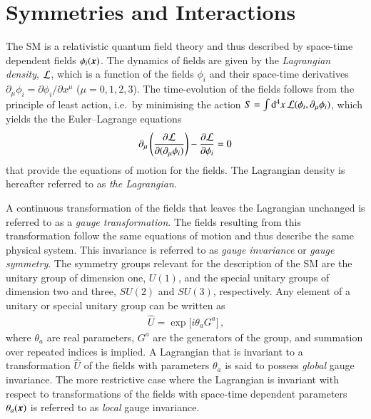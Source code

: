 \section{Symmetries and Interactions}
\label{sec:theo_symmetries_interactions}


The SM is a relativistic quantum field theory and thus described by space-time
dependent fields $\phi_i(\myvec{x})$. The dynamics of fields are given by the
\emph{Lagrangian density}, $\mathcal{L}$, which is a function of the fields
$\phi_i$ and their space-time derivatives
$\partial_\mu \phi_i = \partial \phi_i / \partial x^\mu$ ($\mu = 0, 1, 2,
3$). The time-evolution of the fields follows from the principle of least
action, i.e.\ by minimising the action
$S = \int \mathrm{d}^4x \, \mathcal{L}(\phi_i, \partial_\mu \phi_i)$, which yields
the the Euler--Lagrange equations
\begin{align*}
  \partial_{\mu} \left( \frac{\partial \mathcal{L}}{\partial (\partial_{\mu} \phi_i)} \right) - \frac{\partial \mathcal{L}}{\partial \phi_i} = 0
\end{align*} that provide the equations of motion for the fields. The Lagrangian density is
hereafter referred to as \emph{the Lagrangian}.


A continuous transformation of the fields that leaves the Lagrangian unchanged
is referred to as a \emph{gauge transformation}. The fields resulting from this
transformation follow the same equations of motion and thus describe the same
physical system. This invariance is referred to as \emph{gauge invariance} or
\emph{gauge symmetry}.
The symmetry groups relevant for the description of the SM are the unitary group
of dimension one, $U(1)$, and the special unitary groups of dimension two and
three, $SU(2)$ and $SU(3)$, respectively. Any element of a unitary or special
unitary group can be written as
\begin{align*}
  \hat{U} = \exp\big[ i \theta_a G^a \big] \,\text{,}
\end{align*}
where $\theta_a$ are real parameters, $G^a$ are the generators of the group, and
summation over repeated indices is implied. A Lagrangian that is invariant to a
transformation $\hat{U}$ of the fields with parameters $\theta_a$ is said to
possess \emph{global} gauge invariance. The more restrictive case where the
Lagrangian is invariant with respect to transformations of the fields with
space-time dependent parameters $\theta_a(\myvec{x})$ is referred to as
\emph{local} gauge invariance.

